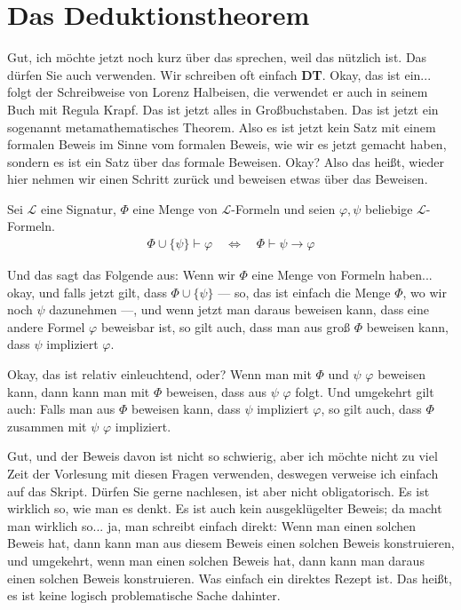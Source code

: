 \section{Das Deduktionstheorem}

\begin{spoken-clean}[00:47:39 - 00:48:39]
Gut, ich möchte jetzt noch kurz über das  sprechen, weil das nützlich ist. Das dürfen Sie auch verwenden. Wir schreiben oft einfach \textbf{DT}. Okay, das ist ein... folgt der Schreibweise von Lorenz Halbeisen, die verwendet er auch in seinem Buch mit Regula Krapf. Das ist jetzt alles in Großbuchstaben. Das ist jetzt ein sogenannt metamathematisches Theorem. Also es ist jetzt kein Satz mit einem formalen Beweis im Sinne vom formalen Beweis, wie wir es jetzt gemacht haben, sondern es ist ein Satz über das formale Beweisen. Okay? Also das heißt, wieder hier nehmen wir einen Schritt zurück und beweisen etwas über das Beweisen.
\end{spoken-clean}

\begin{math-stroke}
Sei $\mathcal{L}$ eine Signatur, $\Phi$ eine Menge von $\mathcal{L}$-Formeln und seien $\varphi, \psi$ beliebige $\mathcal{L}$-Formeln.
\begin{align}
    \Phi \cup \{\psi\} \vdash \varphi \quad \iff \quad \Phi \vdash \psi \rightarrow \varphi \nonumber
\end{align}
\end{math-stroke}

\begin{spoken-clean}[00:48:40 - 00:51:04]
Und das sagt das Folgende aus: Wenn wir $\Phi$ eine Menge von Formeln haben... okay, und falls jetzt gilt, dass $\Phi \cup \{\psi\}$ --- so, das ist einfach die Menge $\Phi$, wo wir noch $\psi$ dazunehmen ---, und wenn jetzt man daraus beweisen kann, dass eine andere Formel $\varphi$ beweisbar ist, so gilt auch, dass man aus groß $\Phi$ beweisen kann, dass $\psi$ impliziert $\varphi$.

Okay, das ist relativ einleuchtend, oder? Wenn man mit $\Phi$ und $\psi$ $\varphi$ beweisen kann, dann kann man mit $\Phi$ beweisen, dass aus $\psi$ $\varphi$ folgt. Und umgekehrt gilt auch: Falls man aus $\Phi$ beweisen kann, dass $\psi$ impliziert $\varphi$, so gilt auch, dass $\Phi$ zusammen mit $\psi$ $\varphi$ impliziert.

Gut, und der Beweis davon ist nicht so schwierig, aber ich möchte nicht zu viel Zeit der Vorlesung mit diesen Fragen verwenden, deswegen verweise ich einfach auf das Skript. Dürfen Sie gerne nachlesen, ist aber nicht obligatorisch. Es ist wirklich so, wie man es denkt. Es ist auch kein ausgeklügelter Beweis; da macht man wirklich so... ja, man schreibt einfach direkt: Wenn man einen solchen Beweis hat, dann kann man aus diesem Beweis einen solchen Beweis konstruieren, und umgekehrt, wenn man einen solchen Beweis hat, dann kann man daraus einen solchen Beweis konstruieren. Was einfach ein direktes Rezept ist. Das heißt, es ist keine logisch problematische Sache dahinter.
\end{spoken-clean}

